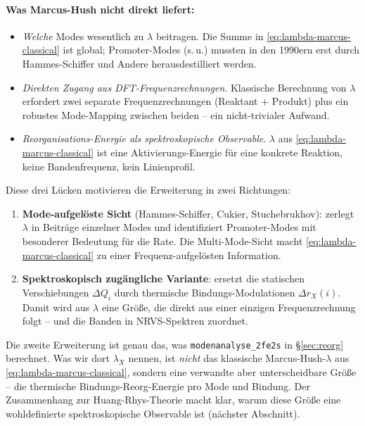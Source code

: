 \documentclass[11pt,a4paper,twoside]{article}
\theoremstyle{remark}
\begin{document}
\paragraph{Was Marcus-Hush nicht direkt liefert:}
\begin{itemize}\setlength{\itemsep}{0pt}
  \item \emph{Welche} Modes wesentlich zu $\lambda$ beitragen.
        Die Summe in \eqref{eq:lambda-marcus-classical} ist global;
        Promoter-Modes (s.\,u.) mussten in den 1990ern erst durch
        Hammes-Schiffer und Andere herausdestilliert werden.
  \item \emph{Direkten Zugang aus DFT-Frequenzrechnungen}. Klassische
        Berechnung von $\lambda$ erfordert zwei separate
        Frequenzrechnungen (Reaktant + Produkt) plus ein robustes
        Mode-Mapping zwischen beiden -- ein nicht-trivialer
        Aufwand.
  \item \emph{Reorganisations-Energie als spektroskopische Observable}.
        $\lambda$ aus \eqref{eq:lambda-marcus-classical} ist eine
        Aktivierungs-Energie f\"ur eine konkrete Reaktion, keine
        Bandenfrequenz, kein Linienprofil.
\end{itemize}

Diese drei Lücken motivieren die Erweiterung in zwei Richtungen:

\begin{enumerate}
  \item \textbf{Mode-aufgel\"oste Sicht} (Hammes-Schiffer, Cukier,
        Stuchebrukhov): zerlegt $\lambda$ in Beitr\"age einzelner
        Modes und identifiziert Promoter-Modes mit besonderer
        Bedeutung f\"ur die Rate. Die Multi-Mode-Sicht macht
        \eqref{eq:lambda-marcus-classical} zu einer
        Frequenz-aufgel\"osten Information.
  \item \textbf{Spektroskopisch zug\"angliche Variante}: ersetzt die
        statischen Verschiebungen $\Delta Q_i$ durch thermische
        Bindungs-Modulationen $\Delta r_X(i)$. Damit wird aus
        $\lambda$ eine Gr\"o{\ss}e, die direkt aus einer einzigen
        Frequenzrechnung folgt -- und die Banden in NRVS-Spektren
        zuordnet.
\end{enumerate}

Die zweite Erweiterung ist genau das, was \texttt{modenanalyse\_2fe2s}
in \S\ref{sec:reorg} berechnet. Was wir dort $\lambda_X$ nennen, ist
\emph{nicht} das klassische Marcus-Hush-$\lambda$ aus
\eqref{eq:lambda-marcus-classical}, sondern eine verwandte aber
unterscheidbare Gr\"o{\ss}e -- die thermische Bindungs-Reorg-Energie pro
Mode und Bindung. Der Zusammenhang zur Huang-Rhys-Theorie macht klar,
warum diese Gr\"o{\ss}e eine wohldefinierte spektroskopische Observable
ist (n\"achster Abschnitt).
\end{document}
